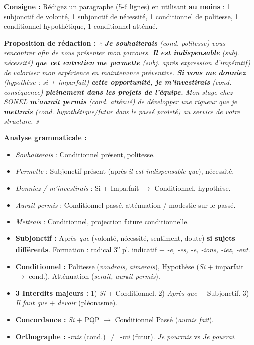 \documentclass[11pt]{article}
\begin{document}
\begin{experience}
\textbf{Consigne :} Rédigez un paragraphe (5-6 lignes) en utilisant \textbf{au moins} : 1 subjonctif de volonté, 1 subjonctif de nécessité, 1 conditionnel de politesse, 1 conditionnel hypothétique, 1 conditionnel atténué.

\textbf{Proposition de rédaction :}
\emph{« \textbf{Je souhaiterais} (cond. politesse) vous rencontrer afin de vous présenter mon parcours. \textbf{Il est indispensable} (subj. nécessité) \textbf{que cet entretien me permette} (subj. après expression d'impératif) de valoriser mon expérience en maintenance préventive. \textbf{Si vous me donniez} (hypothèse : si + imparfait) \textbf{cette opportunité, je m'investirais} (cond. conséquence) \textbf{pleinement dans les projets de l'équipe.} Mon stage chez SONEL \textbf{m'aurait permis} (cond. atténué) de développer une rigueur que je \textbf{mettrais} (cond. hypothétique/futur dans le passé projeté) au service de votre structure. »}

\textbf{Analyse grammaticale :}
\begin{itemize}
    \item \emph{Souhaiterais} : Conditionnel présent, politesse.
    \item \emph{Permette} : Subjonctif présent (après \emph{il est indispensable que}), nécessité.
    \item \emph{Donniez / m'investirais} : Si + Imparfait $\rightarrow$ Conditionnel, hypothèse.
    \item \emph{Aurait permis} : Conditionnel passé, atténuation / modestie sur le passé.
    \item \emph{Mettrais} : Conditionnel, projection future conditionnelle.
\end{itemize}
\end{experience}

\begin{aretenir}
\begin{itemize}
    \item \textbf{Subjonctif :} Après \emph{que} (volonté, nécessité, sentiment, doute) \textbf{si sujets différents}. Formation : radical 3\textsuperscript{e} pl. indicatif + \emph{-e, -es, -e, -ions, -iez, -ent}.
    \item \textbf{Conditionnel :} Politesse (\emph{voudrais, aimerais}), Hypothèse (\emph{Si} + imparfait $\rightarrow$ cond.), Atténuation (\emph{serait, aurait permis}).
    \item \textbf{3 Interdits majeurs :} 1) \emph{Si} + Conditionnel. 2) \emph{Après que} + Subjonctif. 3) \emph{Il faut que} + \emph{devoir} (pléonasme).
    \item \textbf{Concordance :} \emph{Si} + PQP $\rightarrow$ Conditionnel Passé (\emph{aurais fait}).
    \item \textbf{Orthographe :} \emph{-rais} (cond.) $\neq$ \emph{-rai} (futur). \emph{Je pourrais} vs \emph{Je pourrai}.
\end{itemize}
\end{aretenir}
\end{document}
